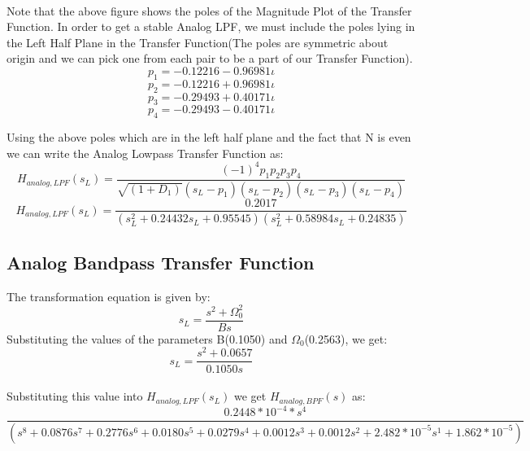 \documentclass[12pt]{article}
\begin{document}
\\Note that the above figure shows the poles of the Magnitude Plot of the Transfer Function. In order to get a stable Analog LPF, we must include the poles lying in the Left Half Plane in the Transfer Function(The poles are symmetric about origin and we can pick one from each pair to be a part of our Transfer Function).
\begin{equation*}
p_{1} = -0.12216 - 0.96981\iota
\end{equation*}
\begin{equation*}
p_{2} = -0.12216 + 0.96981\iota
\end{equation*}
\begin{equation*}
p_{3} = -0.29493 + 0.40171\iota
\end{equation*}
\begin{equation*}
p_{4} = -0.29493 - 0.40171\iota
\end{equation*}

Using the above poles which are in the left half plane and the fact that N is even we can write the Analog Lowpass Transfer Function as:
\begin{equation*}
H_{analog,LPF}(s_{L}) = \frac{(-1)^{4}p_{1}p_{2}p_{3}p_{4}}{\sqrt{(1+D_{1})}(s_{L}-p_{1})(s_{L}-p_{2})(s_{L}-p_{3})(s_{L}-p_{4})}
\end{equation*}
\begin{equation*}
H_{analog,LPF}(s_{L}) = \frac{0.2017}{(s_{L}^{2} + 0.24432s_{L} + 0.95545)(s_{L}^{2} + 0.58984s_{L} + 0.24835)}
\end{equation*}

\subsection{Analog Bandpass Transfer Function}
The transformation equation is given by:
\begin{equation*}
s_{L} = \frac{s^{2} + \Omega _{0}^{2}}{Bs}
\end{equation*}
Substituting the values of the parameters B(0.1050) and $\Omega _{0}$(0.2563), we get:
\begin{equation*}
s_{L} = \frac{s^{2} + 0.0657}{0.1050s}
\end{equation*}
\\Substituting this value into $H_{analog,LPF}(s_{L})$ we get $H_{analog,BPF}(s)$ as:
\begin{equation*}
\frac{  0.2448*10^{-4}*s^{4}}{(s^{8}+0.0876s^{7}+0.2776s^{6}+0.0180s^{5}+0.0279s^{4}+0.0012s^{3}+0.0012s^{2}+2.482*10^{-5}s^{1}+1.862*10^{-5})}
\end{equation*}
\end{document}
